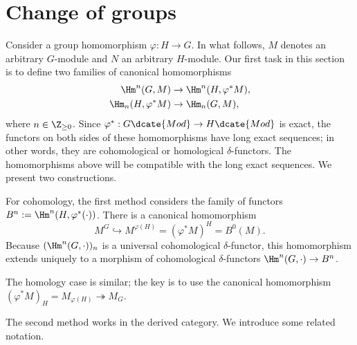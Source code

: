 
\section{Change of groups}\label{sec:change-of-group}
\hypertarget{o014.aljabr2.chapter6.change-of-group}{ }

Consider a group homomorphism $\varphi:H\to G$. In what follows, $M$ denotes
an arbitrary $G$-module and $N$ an arbitrary $H$-module. Our first task in
this section is to define two families of canonical homomorphisms
\begin{equation}\label{eqn:change-of-group-coh}\begin{aligned}
	\Hm^n(G, M) & \to \Hm^n(H, \varphi^* M), \\
	\Hm_n(H, \varphi^* M) & \to \Hm_n(G, M),
\end{aligned}\end{equation}
where $n\in\Z_{\geq0}$. Since
$\varphi^*:G\dcate{Mod}\to H\dcate{Mod}$ is exact, the functors on both
sides of these homomorphisms have long exact sequences; in other words, they
are cohomological or homological $\delta$-functors. The homomorphisms above
will be compatible with the long exact sequences. We present two
constructions.

For cohomology, the first method considers the family of functors
$B^n:=\Hm^n(H,\varphi^*(\cdot))$. There is a canonical homomorphism
\[ M^G \hookrightarrow M^{\varphi(H)} = (\varphi^* M)^H =  B^0(M). \]
Because $(\Hm^n(G,\cdot))_n$ is a universal cohomological $\delta$-functor,
this homomorphism extends uniquely to a morphism of cohomological
$\delta$-functors $\Hm^n(G,\cdot)\to B^n$.

The homology case is similar; the key is to use the canonical homomorphism
$(\varphi^*M)_H=M_{\varphi(H)}\twoheadrightarrow M_G$.

The second method works in the derived category. We introduce some related
notation.

